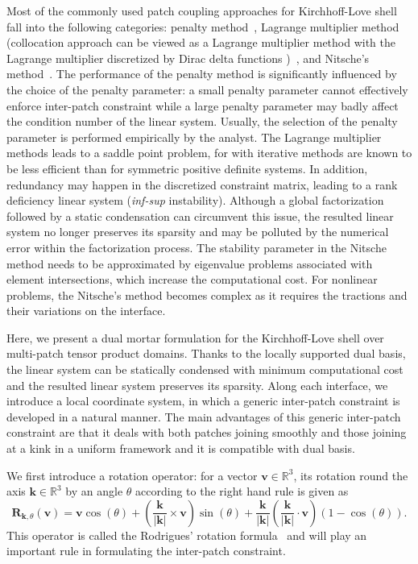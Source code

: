 Most of the commonly used patch coupling approaches for Kirchhoff-Love shell fall into the following categories: penalty method~\cite{kiendl2010bending, herrema2019penalty}, Lagrange multiplier method (collocation approach can be viewed as a Lagrange multiplier method with the Lagrange multiplier discretized by Dirac delta functions )~\cite{coox2017flexible, hirschler2019embedded, schuss2019multi, goyal2017penalty}, and Nitsche's method~\cite{guo_nitsches_2015, nguyen2017isogeometric}. The performance of the penalty method is significantly influenced by the choice of the penalty parameter: a small penalty parameter cannot effectively enforce inter-patch constraint while a large penalty parameter may badly affect the condition number of the linear system. Usually, the selection of the penalty parameter is performed empirically by the analyst. The Lagrange multiplier methods leads to a saddle point problem, for with iterative methods are known to be less efficient than for symmetric positive definite systems. In addition, redundancy may happen in the discretized constraint matrix, leading to a rank deficiency linear system (\textit{inf-sup} instability). Although a global factorization followed by a static condensation can circumvent this issue, the resulted linear system no longer preserves its sparsity and may be polluted by the numerical error within the factorization process. The stability parameter in the Nitsche method needs to be approximated by eigenvalue problems associated with element intersections, which increase the computational cost. For nonlinear problems, the Nitsche's method becomes complex as it requires the tractions and their variations on the interface. \par

Here, we present a dual mortar formulation for the Kirchhoff-Love shell over multi-patch tensor product domains. Thanks to the locally supported dual basis, the linear system can be statically condensed with minimum computational cost and the resulted linear system preserves its sparsity. Along each interface, we introduce a local coordinate system, in which a generic inter-patch constraint is developed in a natural manner. The main advantages of this generic inter-patch constraint are that it deals with both patches joining smoothly and those joining at a kink in a uniform framework and it is compatible with dual basis.\par

We first introduce a rotation operator: for a vector $\mathbf{v}\in\mathbb{R}^3$, its rotation round the axis $\mathbf{k}\in\mathbb{R}^3$ by an angle $\theta$ according to the right hand rule is given as
\begin{equation}
	\mathbf{R}_{\mathbf{k},\theta}(\mathbf{v}) = \mathbf{v}\cos(\theta)+\left(\frac{\mathbf{k}}{\vert \mathbf{k} \vert}\times \mathbf{v}\right)\sin(\theta)+\frac{\mathbf{k}}{\vert \mathbf{k} \vert}\left(\frac{\mathbf{k}}{\vert \mathbf{k} \vert}\cdot\mathbf{v}\right)(1-\cos(\theta)). \label{eq:rodrigues_rotation}
\end{equation}
This operator is called the Rodrigues' rotation formula~\cite{rodrigues1840lois} and will play an important rule in formulating the inter-patch constraint.\par

